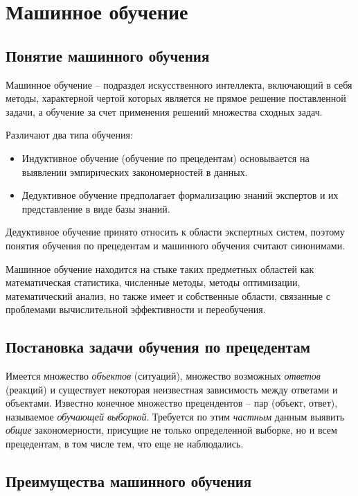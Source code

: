 \section{Машинное обучение}

\subsection{Понятие машинного обучения}

Машинное обучение -- подраздел искусственного интеллекта, включающий в себя
методы, характерной чертой которых является не прямое решение поставленной
задачи, а обучение за счет применения решений множества сходных задач.

Различают два типа обучения:
    
\begin{itemize}
      \item Индуктивное обучение (обучение по прецедентам) основывается
            на выявлении эмпирических закономерностей в данных.

      \item Дедуктивное обучение предполагает формализацию знаний экспертов
            и их представление в виде базы знаний.
\end{itemize}

Дедуктивное обучение принято относить к области экспертных систем,
поэтому понятия обучения по прецедентам и машинного обучения считают синонимами.

Машинное обучение находится на стыке таких предметных областей как математическая статистика,
численные методы, методы оптимизации, математический анализ, но также имеет и собственные области, 
связанные с проблемами вычислительной эффективности и переобучения.

\subsection{Постановка задачи обучения по прецедентам}

Имеется множество \emph{объектов} (ситуаций), множество возможных \emph{ответов} (реакций)
и существует некоторая неизвестная зависимость между ответами и объектами.
Известно конечное множество прецендентов -- пар (объект, ответ), называемое \emph{обучающей выборкой}.
Требуется по этим \emph{частным} данным выявить \emph{общие} закономерности, присущие не только
определенной выборке, но и всем прецедентам, в том числе тем, что еще не наблюдались.

\subsection{Преимущества машинного обучения}

